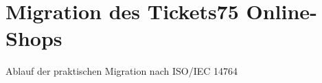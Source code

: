 \chapter{Migration des Tickets75 Online-Shops}\label{ch:migration} 

Ablauf der praktischen Migration nach ISO/IEC 14764

